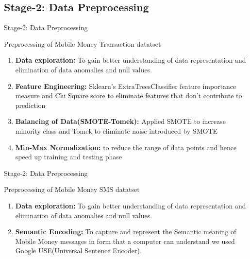 \documentclass[11pt,aspectratio=169]{beamer}
\begin{document}
		\subsection{Stage-2: Data Preprocessing}
	\begin{frame}{  Stage-2: Data Preprocessing}
		\begin{block}{Preprocessing of Mobile Money Transaction datatset}
			\begin{enumerate}
				\item \textbf{Data exploration:} To gain better understanding of data representation and elimination of data anomalies and null values. 
				 \item \textbf{Feature Engineering:} Sklearn’s ExtraTreesClassifier feature importance measure and Chi Square score to eliminate features that don't contribute to prediction
				 \item \textbf{Balancing of Data(SMOTE-Tomek):} Applied SMOTE to increase minority class and Tomek to eliminate noise introduced by SMOTE
			\item \textbf{Min-Max Normalization:} to reduce the range of data points and hence speed up training and testing phase
			\end{enumerate}
		\end{block}
		
	\end{frame}

	\begin{frame}{ Stage-2: Data Preprocessing}
		\begin{block}{\small Preprocessing of Mobile Money SMS datatset}
			\begin{enumerate}
				\item \textbf{Data exploration:} To gain better understanding of data representation and elimination of data anomalies and null values. 
				\item \textbf{Semantic Encoding:} To capture and represent the Semantic meaning of Mobile Money messages in form that a computer can understand we used Google USE(Universal Sentence Encoder).
			\end{enumerate}
		\end{block}
	\end{frame}
	
\end{document}
